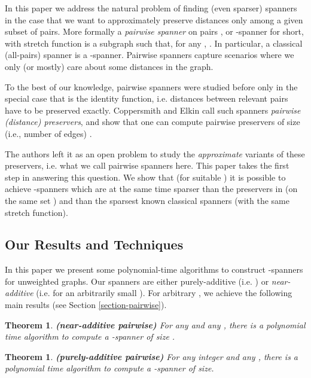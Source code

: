 \documentclass[a4paper,11pt]{article}
\newtheorem{theorem}[lemma]{Theorem}
\theoremstyle{definition}
\begin{document}
In this paper we address the natural problem of finding (even sparser) spanners in the case that we want to approximately preserve distances only among a given subset  of pairs. More formally a \emph{pairwise spanner} on pairs , or -spanner for short, with stretch function  is a subgraph  such that, for any , . In particular, a classical (all-pairs) spanner is a -spanner. Pairwise spanners capture scenarios where we only (or mostly) care about some distances in the graph. 

To the best of our knowledge, pairwise spanners were studied before only in the special case that  is the identity function, i.e.  distances between relevant pairs have to be preserved exactly.  Coppersmith and Elkin \cite{CE05} call such spanners \emph{pairwise (distance) preservers}, and show that one can compute pairwise preservers of size (i.e., number of edges) . 

The authors left it as an open problem to study the {\em approximate} variants of these 
preservers, i.e. what we call pairwise spanners here. This paper takes the first step in answering this question. We show that (for suitable ) it is possible to achieve -spanners which are at the same time sparser than the preservers in \cite{CE05} (on the same set ) and than the sparsest known classical spanners (with the same stretch function). 








\subsection{Our Results and Techniques}

In this paper we present some polynomial-time algorithms to construct  -spanners for unweighted graphs. Our spanners are either purely-additive (i.e. ) or \emph{near-additive} (i.e.  for an arbitrarily small ). 
For arbitrary , we achieve the following main results (see Section \ref{section-pairwise}).
\begin{theorem}
\label{thm:pairwise} {\bf (near-additive pairwise)}
For any  and any , there is a polynomial time algorithm to compute a  -spanner of size . 
\end{theorem}
\begin{theorem}
\label{thm:pairwise2} {\bf (purely-additive pairwise)}
For any integer  and any , there is a polynomial time algorithm to compute a  -spanner of size\newline .
\end{theorem}
\end{document}
